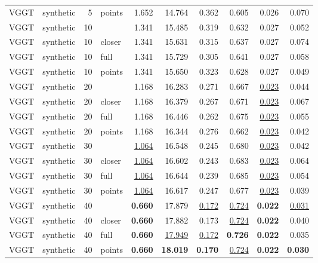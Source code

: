 \begin{table}[H]
\begin{tabular}{llrlrrrrrr}
VGGT & synthetic & 5 & points & 1.652 & 14.764 & 0.362 & 0.605 & 0.026 & 0.070 \\
VGGT & synthetic & 10 &  & 1.341 & 15.485 & 0.319 & 0.632 & 0.027 & 0.052 \\
VGGT & synthetic & 10 & closer & 1.341 & 15.631 & 0.315 & 0.637 & 0.027 & 0.074 \\
VGGT & synthetic & 10 & full & 1.341 & 15.729 & 0.305 & 0.641 & 0.027 & 0.058 \\
VGGT & synthetic & 10 & points & 1.341 & 15.650 & 0.323 & 0.628 & 0.027 & 0.049 \\
VGGT & synthetic & 20 &  & 1.168 & 16.283 & 0.271 & 0.667 & \underline{0.023} & 0.044 \\
VGGT & synthetic & 20 & closer & 1.168 & 16.379 & 0.267 & 0.671 & \underline{0.023} & 0.067 \\
VGGT & synthetic & 20 & full & 1.168 & 16.446 & 0.262 & 0.675 & \underline{0.023} & 0.055 \\
VGGT & synthetic & 20 & points & 1.168 & 16.344 & 0.276 & 0.662 & \underline{0.023} & 0.042 \\
VGGT & synthetic & 30 &  & \underline{1.064} & 16.548 & 0.245 & 0.680 & \underline{0.023} & 0.042 \\
VGGT & synthetic & 30 & closer & \underline{1.064} & 16.602 & 0.243 & 0.683 & \underline{0.023} & 0.064 \\
VGGT & synthetic & 30 & full & \underline{1.064} & 16.644 & 0.239 & 0.685 & \underline{0.023} & 0.054 \\
VGGT & synthetic & 30 & points & \underline{1.064} & 16.617 & 0.247 & 0.677 & \underline{0.023} & 0.039 \\
VGGT & synthetic & 40 &  & \textbf{0.660} & 17.879 & \underline{0.172} & \underline{0.724} & \textbf{0.022} & \underline{0.031} \\
VGGT & synthetic & 40 & closer & \textbf{0.660} & 17.882 & 0.173 & \underline{0.724} & \textbf{0.022} & 0.040 \\
VGGT & synthetic & 40 & full & \textbf{0.660} & \underline{17.949} & \underline{0.172} & \textbf{0.726} & \textbf{0.022} & 0.035 \\
VGGT & synthetic & 40 & points & \textbf{0.660} & \textbf{18.019} & \textbf{0.170} & \underline{0.724} & \textbf{0.022} & \textbf{0.030} \\
\bottomrule
\end{tabular}
\end{table}